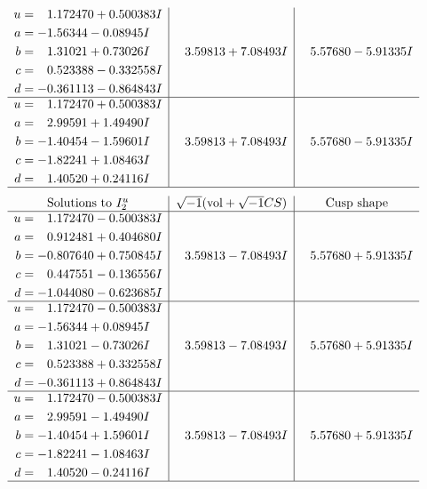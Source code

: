 \documentclass[1p]{elsarticle_modified}
\theoremstyle{definition}
\newcommand{\I}{\sqrt{-1}}
\begin{document}
$$\begin{array}{c|c|c}
\begin{aligned}
u &= \phantom{-}1.172470 + 0.500383 I \\
a &= -1.56344 - 0.08945 I \\
b &= \phantom{-}1.31021 + 0.73026 I \\
c &= \phantom{-}0.523388 - 0.332558 I \\
d &= -0.361113 - 0.864843 I\end{aligned}
 & \phantom{-}3.59813 + 7.08493 I & \phantom{-}5.57680 - 5.91335 I \\ \hline\begin{aligned}
u &= \phantom{-}1.172470 + 0.500383 I \\
a &= \phantom{-}2.99591 + 1.49490 I \\
b &= -1.40454 - 1.59601 I \\
c &= -1.82241 + 1.08463 I \\
d &= \phantom{-}1.40520 + 0.24116 I\end{aligned}
 & \phantom{-}3.59813 + 7.08493 I & \phantom{-}5.57680 - 5.91335 I\\
 \hline 
 \end{array}$$\newpage$$\begin{array}{c|c|c}  
\text{Solutions to }I^u_{2}& \I (\text{vol} + \sqrt{-1}CS) & \text{Cusp shape}\\
 \hline 
\begin{aligned}
u &= \phantom{-}1.172470 - 0.500383 I \\
a &= \phantom{-}0.912481 + 0.404680 I \\
b &= -0.807640 + 0.750845 I \\
c &= \phantom{-}0.447551 - 0.136556 I \\
d &= -1.044080 - 0.623685 I\end{aligned}
 & \phantom{-}3.59813 - 7.08493 I & \phantom{-}5.57680 + 5.91335 I \\ \hline\begin{aligned}
u &= \phantom{-}1.172470 - 0.500383 I \\
a &= -1.56344 + 0.08945 I \\
b &= \phantom{-}1.31021 - 0.73026 I \\
c &= \phantom{-}0.523388 + 0.332558 I \\
d &= -0.361113 + 0.864843 I\end{aligned}
 & \phantom{-}3.59813 - 7.08493 I & \phantom{-}5.57680 + 5.91335 I \\ \hline\begin{aligned}
u &= \phantom{-}1.172470 - 0.500383 I \\
a &= \phantom{-}2.99591 - 1.49490 I \\
b &= -1.40454 + 1.59601 I \\
c &= -1.82241 - 1.08463 I \\
d &= \phantom{-}1.40520 - 0.24116 I\end{aligned}
 & \phantom{-}3.59813 - 7.08493 I & \phantom{-}5.57680 + 5.91335 I\\
 \hline 
 \end{array}$$\newpage\newpage\renewcommand{\arraystretch}{1}
\end{document}

